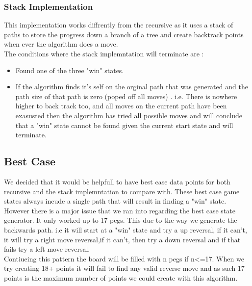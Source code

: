 \documentclass[a4paper]{article}
\begin{document}
\subsubsection{Stack Implementation}
This implementation works diffrently from the recursive as it uses a stack of paths to store the progress down a branch of a tree and create backtrack points when ever the algorithm does a move.\\
The conditions where the stack implemntation will terminate are :
\begin{itemize}
\item Found one of the three "win" states.
\item If the algorithm finds it's self on the orginal path that was generated and the path size of that path is zero (poped off all moves) . i.e. There is nowhere higher to back track too, and all moves on the current path have been exasusted then the algorithm has tried all possible moves and will conclude that a "win"  state cannot be found given the current start state and will terminate.
\end{itemize}
\subsection{Best Case}
We decided that it would be helpfull to have best case data points for both recursive and the stack implemntation to compare with. These best case game states always incude a single path that will result in finding a "win" state.\\
However there is a major issue that we ran into regarding the best case state generator. It only worked up to 17 pegs. This due to the way we generate the backwards path. i.e it will start at a "win" state and try a up reversal, if it can't, it will try a right move reversal,if it can't, then try a down reversal and if that fails try a left move reversal.\\
Contiueing this pattern the board will be filled with n pegs if n<=17. When we try creating 18+ points it will fail to find any valid reverse move and as such 17 points is the maximum number of points we could create with this algorithm.
\end{document}

